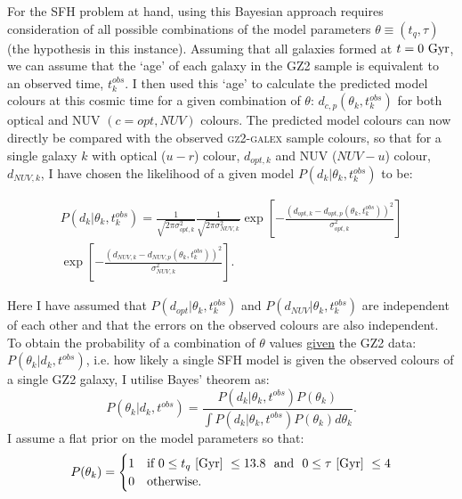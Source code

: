 For the SFH problem at hand, using this Bayesian approach requires consideration of all possible combinations of the model parameters $\theta \equiv (t_{q}, \tau)$ (the hypothesis in this instance). Assuming that all galaxies formed at $t=0~\rm{Gyr}$, we can assume that the `age' of each galaxy in the GZ2 sample is equivalent to an observed time, $t^{obs}_{k}$. I then used this  `age' to calculate the predicted model colours at this cosmic time for a given combination of $\theta$: $d_{c,p}(\theta_k, t^{obs}_{k})$ for both optical and NUV $(c={opt,NUV})$ colours. The predicted model colours can now directly be compared with the observed \textsc{gz2-galex} sample colours, so that for a single galaxy $k$ with optical ($u-r$) colour, $d_{opt, k}$ and NUV ($NUV-u$) colour, $d_{NUV,k}$,  I have chosen the likelihood of a given model $P(d_{k}|\theta_k, t^{obs}_{k})$ to be:


\begin{equation}\label{like}
\begin{split}
P(d_{k}|\theta_k, t^{obs}_{k}) = \frac{1}{\sqrt{2\pi\sigma_{opt, k}^2}}\frac{1}{\sqrt{2\pi\sigma_{NUV, k}^2}} \exp{\left[ - \frac{(d_{opt, k} - d_{opt, p}(\theta_k, t_{k}^{obs}))^2}{\sigma_{opt, k}^2} \right]} \\ \exp{\left[ - \frac{(d_{NUV, k} - d_{NUV, p}(\theta_k, t_{k}^{obs}))^2}{\sigma_{NUV, k}^2} \right]}.
\end{split}
\end{equation}


Here I have assumed that $P(d_{opt}|\theta_k, t^{obs}_{k})$ and $P(d_{NUV}|\theta_k, t^{obs}_{k})$ are independent of each other and that the errors on the observed colours are also independent. To obtain the probability of a combination of $\theta$ values \underline{given} the GZ2 data: $P(\theta_k|d_k, t^{obs})$, i.e. how likely a single SFH model is  given the observed colours of a single GZ2 galaxy, I utilise Bayes' theorem as:
 \begin{equation}\label{big}
P(\theta_k|d_k, t^{obs}) = \frac{P(d_k|\theta_k, t^{obs})P(\theta_k)}{\int P(d_k |\theta_k, t^{obs})P(\theta_k) d\theta_k}.
\end{equation}
I assume a flat prior on the model parameters so that:
\begin{equation}\label{prior}
P(\theta_k) =
\begin{cases}
1 & \text{if } 0 \leq t_q ~\rm{[Gyr]}~ \leq 13.8 ~  \text{ and } ~ 0 \leq \tau  ~\rm{[Gyr]}~ \leq 4\\
0 & \text{otherwise.} \\
\end{cases}
\end{equation}

